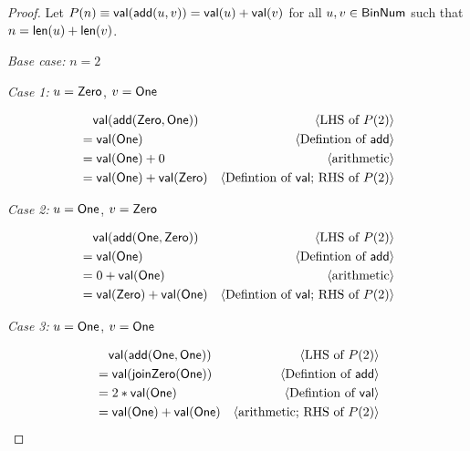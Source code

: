 \documentclass[11pt,fleqn]{article}
\newcommand{\mname}[1]{\mbox{\sf #1}}
\newcommand{\pnote}[1]{{\langle \text{#1} \rangle}}
\begin{document}
  \begin{proof}
  Let $P(n)  \equiv \mname{val}(\mname{add}(u, v)) = \mname{val}(u) + \mname{val}(v)$
  for all $u, v \in \mname{BinNum}$ such that $n = \mname{len}(u) + \mname{len}(v)$.

  \medskip

  \emph{Base case:}
  $n = 2$
  
  \emph{Case 1:}
  $u = \mname{Zero}$, $v = \mname{One}$

  \begin{align*}
  &\phantom{{}=} \mname{val}(\mname{add}(\mname{Zero}, \mname{One})) & \pnote{LHS of $P(2)$}\\
  &= \mname{val}(\mname{One}) & \pnote{Defintion of $\mname{add}$}\\
  &= \mname{val}(\mname{One}) + 0 & \pnote{arithmetic}\\
  &= \mname{val}(\mname{One}) + \mname{val}(\mname{Zero}) &\pnote{Defintion of $\mname{val}$; RHS of $P(2)$}
  \end{align*}

  \emph{Case 2:}
  $u = \mname{One}$, $v = \mname{Zero}$

  \begin{align*}
    &\phantom{{}=} \mname{val}(\mname{add}(\mname{One}, \mname{Zero})) & \pnote{LHS of $P(2)$}\\
    &= \mname{val}(\mname{One}) & \pnote{Defintion of $\mname{add}$}\\
    &= 0 + \mname{val}(\mname{One}) & \pnote{arithmetic}\\
    &= \mname{val}(\mname{Zero}) + \mname{val}(\mname{One}) &\pnote{Defintion of $\mname{val}$; RHS of $P(2)$}
  \end{align*}

  \newpage

  \emph{Case 3:}
  $u = \mname{One}$, $v = \mname{One}$

  \begin{align*} 
    &\phantom{{}=} \mname{val}(\mname{add}(\mname{One}, \mname{One})) & \pnote{LHS of $P(2)$}\\
    &= \mname{val}(\mname{joinZero}(\mname{One})) & \pnote {Defintion of $\mname{add}$}\\
    &= 2 * \mname{val}(\mname{One}) & \pnote{Defintion of $\mname{val}$}\\
    &= \mname{val}(\mname{One}) + \mname{val}(\mname{One}) & \pnote{arithmetic; RHS of $P(2)$}\\
  \end{align*}


\end{proof}
\end{document}
